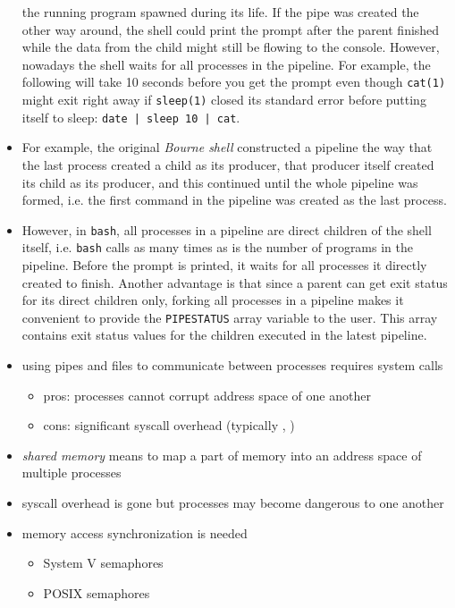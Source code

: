 \begin{itemize}
the running program spawned during its life.  If the pipe was created the other
way around, the shell could print the prompt after the parent finished while the
data from the child might still be flowing to the console.  However, nowadays
the shell waits for all processes in the pipeline.  For example, the following
will take 10 seconds before you get the prompt even though \texttt{cat(1)} might
exit right away if \texttt{sleep(1)} closed its standard error before putting
itself to sleep: \texttt{date | sleep 10 | cat}.
\item For example, the original \emph{Bourne shell} constructed a pipeline the
way that the last process created a child as its producer, that producer itself
created its child as its producer, and this continued until the whole pipeline
was formed, i.e. the first command in the pipeline was created as the last
process.
\item However, in \texttt{bash}, all processes in a pipeline are direct children
of the shell itself, i.e. \texttt{bash} calls  as many times as is
the number of programs in the pipeline.  Before the prompt is printed, it waits
for all processes it directly created to finish.  Another advantage is that
since a parent can get exit status for its direct children only, forking all
processes in a pipeline makes it convenient to provide the \texttt{PIPESTATUS}
array variable to the user. This array contains exit status values for the
children executed in the latest pipeline.
\end{itemize}


\begin{slide}
\begin{itemize}
\item using pipes and files to communicate between processes requires system
calls
\begin{itemize}
\item pros: processes cannot corrupt address space of one another
\item cons: significant syscall overhead (typically ,
)
\end{itemize}
\item \emph{shared memory} means to map a part of memory into an address space
of multiple processes
\item syscall overhead is gone but processes may become dangerous to one another
\item memory access synchronization is needed
\begin{itemize}
  \item System V semaphores
  \item POSIX semaphores
\end{itemize}
\end{itemize}
\end{slide}


